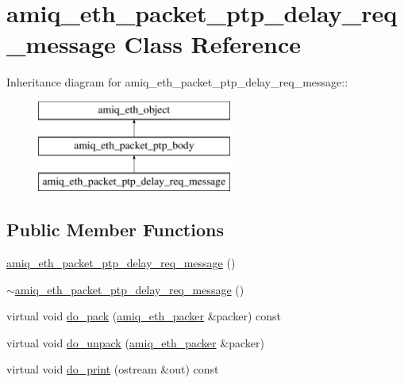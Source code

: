 \hypertarget{classamiq__eth__packet__ptp__delay__req__message}{
\section{amiq\_\-eth\_\-packet\_\-ptp\_\-delay\_\-req\_\-message Class Reference}
\label{classamiq__eth__packet__ptp__delay__req__message}
}
Inheritance diagram for amiq\_\-eth\_\-packet\_\-ptp\_\-delay\_\-req\_\-message::\begin{figure}[H]
\begin{center}
\leavevmode
\includegraphics[height=3cm]{classamiq__eth__packet__ptp__delay__req__message}
\end{center}
\end{figure}
\subsection*{Public Member Functions}
\begin{DoxyCompactItemize}
\item 
\hyperlink{classamiq__eth__packet__ptp__delay__req__message_a87e28dcb09619404e683577e2aff94d3}{amiq\_\-eth\_\-packet\_\-ptp\_\-delay\_\-req\_\-message} ()
\item 
\hyperlink{classamiq__eth__packet__ptp__delay__req__message_a56dccff94f0c8618cc32e89cfbeff0f2}{$\sim$amiq\_\-eth\_\-packet\_\-ptp\_\-delay\_\-req\_\-message} ()
\item 
virtual void \hyperlink{classamiq__eth__packet__ptp__delay__req__message_a746ff6b9bc45d17e7158525b6433f21a}{do\_\-pack} (\hyperlink{classamiq__eth__packer}{amiq\_\-eth\_\-packer} \&packer) const 
\item 
virtual void \hyperlink{classamiq__eth__packet__ptp__delay__req__message_aadf94c8b12005e5bdcbc01e5ca8adef6}{do\_\-unpack} (\hyperlink{classamiq__eth__packer}{amiq\_\-eth\_\-packer} \&packer)
\item 
virtual void \hyperlink{classamiq__eth__packet__ptp__delay__req__message_aac81caa439938e5eb0c2af2dbd9c82ee}{do\_\-print} (ostream \&out) const 
\end{DoxyCompactItemize}
